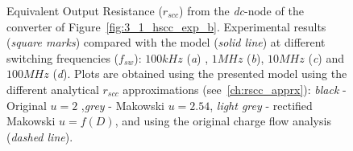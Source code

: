 \begin{figure}[!h]

\centering
    \begin{subfigure}{\textwidth}
        \parbox[c]{.03\linewidth}{\subcaption{}\label{fig:exp_rscc_dc_node_100kHz}}
        \hspace{.02\linewidth}
        \parbox[c]{.95\linewidth}{
        \centering
        }
    \end{subfigure}

    \begin{subfigure}{\textwidth}
        \parbox[c]{.03\linewidth}{\subcaption{}\label{fig:exp_rscc_dc_node_1MHz}}
        \hspace{.02\linewidth}
        \parbox[c]{.95\linewidth}{
        \centering
        }
    \end{subfigure}

    \begin{subfigure}{\textwidth}
        \parbox[c]{.03\linewidth}{\subcaption{}\label{fig:exp_rscc_dc_node_10MHz}}
        \hspace{.02\linewidth}
        \parbox[c]{.95\linewidth}{
        \centering
        }
    \end{subfigure}

    \begin{subfigure}{\textwidth}
        \parbox[c]{.03\linewidth}{\subcaption{}\label{fig:exp_rscc_dc_node_100MHz}}
        \hspace{.02\linewidth}
        \parbox[c]{.95\linewidth}{
        \centering
        }
    \end{subfigure}

\caption{Equivalent Output Resistance ($r_{scc}$) from the \emph{dc}-node of the converter of Figure~\ref{fig:3_1_hscc_exp_b}. Experimental results (\emph{square marks}) compared with the model (\emph{solid line}) at different switching frequencies ($f_{sw}$): $100kHz$ (\emph{a}) , $1MHz$ (\emph{b}), $10MHz$ (\emph{c}) and $100MHz$ (\emph{d}). Plots are obtained using the presented model using  the different analytical $r_{scc}$ approximations (see~\ref{ch:rscc_apprx}): \emph{black} - Original $u=2$ ,\emph{grey} - Makowski  $u=2.54$, \emph{light grey} - rectified Makowski $u=f(D)$, and using the original charge flow analysis (\emph{dashed line}).}
\label{fig:exp_rscc_dc_node_dx}
\end{figure}

